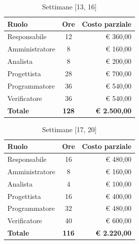 \documentclass[11pt, a4paper]{article}
\begin{document}
\begin{table}[htbp]
    \centering
    \caption{Settimane [13, 16]}
    \vspace{0.2cm}
    \renewcommand{\arraystretch}{1.5}
    \begin{tabularx}{\textwidth}{|X|c|r|}
        \hline
        \rowcolor{gray!10} \textbf{Ruolo} & \textbf{Ore} & \textbf{Costo parziale} \\ \hline
        Responsabile & 12 & € 360,00 \\ \hline
        Amministratore & 8 & € 160,00 \\ \hline
        Analista & 8 & € 200,00 \\ \hline
        Progettista & 28 & € 700,00 \\ \hline
        Programmatore & 36 & € 540,00 \\ \hline
        Verificatore & 36 & € 540,00 \\ \hline
        \rowcolor{gray!20} \textbf{Totale} & \textbf{128} & \textbf{€ 2.500,00} \\ \hline
    \end{tabularx}
\end{table}

\begin{table}[htbp]
    \centering
    \caption{Settimane [17, 20]}
    \vspace{0.2cm}
    \renewcommand{\arraystretch}{1.5}
    \begin{tabularx}{\textwidth}{|X|c|r|}
        \hline
        \rowcolor{gray!10} \textbf{Ruolo} & \textbf{Ore} & \textbf{Costo parziale} \\ \hline
        Responsabile & 16 & € 480,00 \\ \hline
        Amministratore & 8 & € 160,00 \\ \hline
        Analista & 4 & € 100,00 \\ \hline
        Progettista & 16 & € 400,00 \\ \hline
        Programmatore & 32 & € 480,00 \\ \hline
        Verificatore & 40 & € 600,00 \\ \hline
        \rowcolor{gray!20} \textbf{Totale} & \textbf{116} & \textbf{€ 2.220,00} \\ \hline
    \end{tabularx}
\end{table}

\newpage
\end{document}
